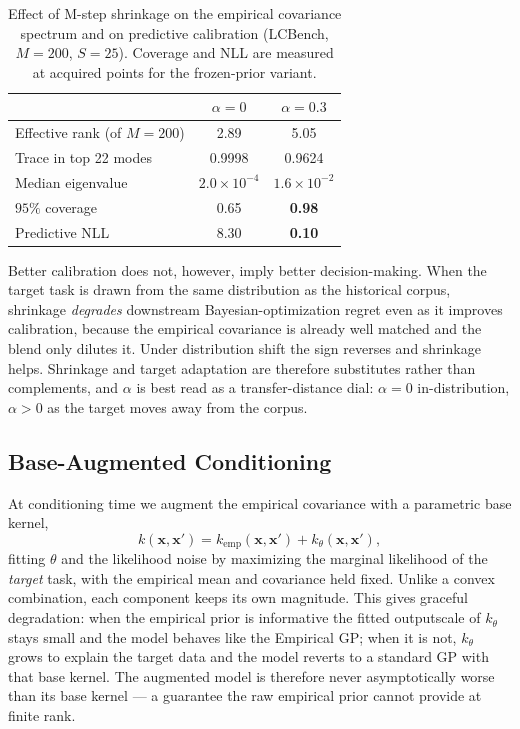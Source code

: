\documentclass{article}
\newcommand{\K}{S}
\newcommand{\vx}{\mathbf{x}}
\begin{document}
\begin{table}[ht]
\small
\centering
\caption{Effect of M-step shrinkage on the empirical covariance spectrum and on predictive calibration (LCBench, $M=200$, $\K=25$). Coverage and NLL are measured at acquired points for the frozen-prior variant.}
\label{tab:shrinkage_spectrum}
\begin{tabular}{lcc}
\toprule
 & $\alpha = 0$ & $\alpha = 0.3$ \\
\midrule
Effective rank (of $M=200$) & 2.89 & 5.05 \\
Trace in top 22 modes       & 0.9998 & 0.9624 \\
Median eigenvalue           & $2.0\times10^{-4}$ & $1.6\times10^{-2}$ \\
\midrule
$95\%$ coverage             & 0.65 & \textbf{0.98} \\
Predictive NLL              & 8.30 & \textbf{0.10} \\
\bottomrule
\end{tabular}
\end{table}

Better calibration does not, however, imply better decision-making. When the target task is drawn from the same distribution as the historical corpus, shrinkage \emph{degrades} downstream Bayesian-optimization regret even as it improves calibration, because the empirical covariance is already well matched and the blend only dilutes it. Under distribution shift the sign reverses and shrinkage helps. Shrinkage and target adaptation are therefore substitutes rather than complements, and $\alpha$ is best read as a transfer-distance dial: $\alpha = 0$ in-distribution, $\alpha > 0$ as the target moves away from the corpus.

\subsection{Base-Augmented Conditioning}
\label{apd:base_augmented}

At conditioning time we augment the empirical covariance with a parametric base kernel,
\begin{equation}
\label{eq:base_augmented}
    k(\vx,\vx') = k_{\text{emp}}(\vx,\vx') + k_{\theta}(\vx,\vx'),
\end{equation}
fitting $\theta$ and the likelihood noise by maximizing the marginal likelihood of the \emph{target} task, with the empirical mean and covariance held fixed. Unlike a convex combination, each component keeps its own magnitude. This gives graceful degradation: when the empirical prior is informative the fitted outputscale of $k_\theta$ stays small and the model behaves like the Empirical GP; when it is not, $k_\theta$ grows to explain the target data and the model reverts to a standard GP with that base kernel. The augmented model is therefore never asymptotically worse than its base kernel --- a guarantee the raw empirical prior cannot provide at finite rank.
\end{document}
